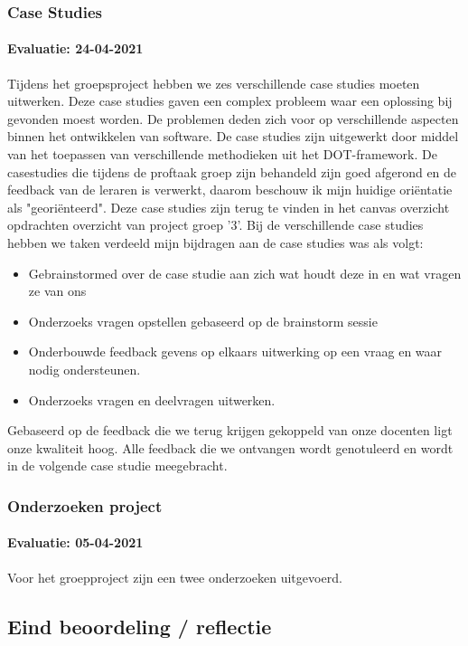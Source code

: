 \subsubsection{Case Studies}
\paragraph{Evaluatie: 24-04-2021}
Tijdens het groepsproject hebben we zes verschillende case studies moeten uitwerken.
Deze case studies gaven een complex probleem waar een oplossing bij gevonden moest worden.
De problemen deden zich voor op verschillende aspecten binnen het ontwikkelen van software.
De case studies zijn uitgewerkt door middel van het toepassen van verschillende methodieken uit het DOT-framework.
De casestudies die tijdens de proftaak groep zijn behandeld zijn goed afgerond en de feedback van de leraren is
verwerkt, daarom beschouw ik mijn huidige oriëntatie als "georiënteerd".
Deze case studies zijn terug te vinden in het canvas overzicht opdrachten overzicht van project groep '3'.
Bij de verschillende case studies hebben we taken verdeeld mijn bijdragen aan de case studies was als volgt:

\begin{itemize}
	\setlength{\itemsep}{0pt}%
	\setlength{\parskip}{0pt}%
	\item Gebrainstormed over de case studie aan zich wat houdt deze in en wat vragen ze van ons
	\item Onderzoeks vragen opstellen gebaseerd op de brainstorm sessie
	\item Onderbouwde feedback gevens op elkaars uitwerking op een vraag en waar nodig ondersteunen.
	\item Onderzoeks vragen en deelvragen uitwerken.

\end{itemize}

Gebaseerd op de feedback die we terug krijgen gekoppeld van onze docenten ligt onze kwaliteit hoog.
Alle feedback die we ontvangen wordt genotuleerd en wordt in de volgende case studie meegebracht.

\subsubsection{Onderzoeken project}
\paragraph{Evaluatie: 05-04-2021}
Voor het groepproject zijn een twee onderzoeken uitgevoerd.

\subsection{Eind beoordeling / reflectie}
\newpage

